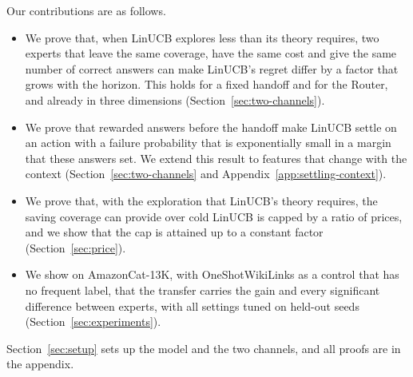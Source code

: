 \documentclass[anon]{alt2027} %
\newif\ifrevmarks\revmarkstrue
\newenvironment{revised}{\ifrevmarks\color{revcolor}\fi}{}
\begin{document}
\begin{revised}
Our contributions are as follows.
\begin{itemize}[itemsep=1pt,topsep=2pt,leftmargin=*]
\item We prove that, when LinUCB explores less than its theory requires, two
experts that leave the same coverage, have the same cost and give the same
number of correct answers can make LinUCB's regret differ by a factor that
grows with the horizon. This holds for a fixed handoff and for the Router,
and already in three dimensions (Section~\ref{sec:two-channels}).
\item We prove that rewarded answers before the handoff make LinUCB settle on
an action with a failure probability that is exponentially small in a margin
that these answers set. We extend this result to features that change with
the context (Section~\ref{sec:two-channels} and
Appendix~\ref{app:settling-context}).
\item We prove that, with the exploration that LinUCB's theory requires, the
saving coverage can provide over cold LinUCB is capped by a ratio of prices,
and we show that the cap is attained up to a constant factor
(Section~\ref{sec:price}).
\item We show on AmazonCat-13K, with OneShotWikiLinks as a control that has
no frequent label, that the transfer carries the gain and every significant
difference between experts, with all settings tuned on held-out seeds
(Section~\ref{sec:experiments}).
\end{itemize}
Section~\ref{sec:setup} sets up the model and the two channels, and all
proofs are in the appendix.
\end{revised}
\end{document}
